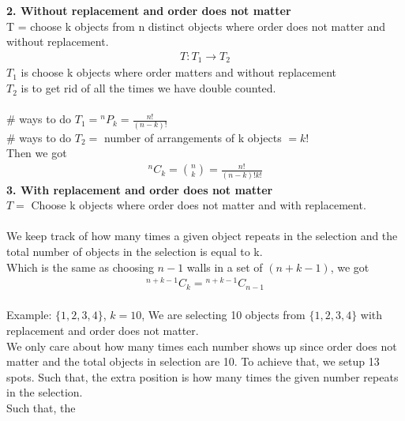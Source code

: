 \documentclass[11pt,oneside]{book}
\theoremstyle{break}
\theoremstyle{break}
\newcommand*{\Perm}[2]{{}^{#1}\!P_{#2}}
\newcommand*{\Comb}[2]{{}^{#1}C_{#2}}
\newcommand{\example}{\color{green}Example: \color{black}}
\begin{document}
\hfill\\
\hfill\\
\textbf{2. Without replacement and order does not matter}\\
T = choose k objects from n distinct objects where order does not matter and without replacement. \begin{align*}
T:T_1\rightarrow T_2
\end{align*}
$T_1$ is choose k objects where order matters and without replacement \\
$T_2$ is to get rid of all the times we have double counted.\\
\hfill\\
$\#$ ways to do $T_1=\Perm{n}{k}=\frac{n!}{(n-k)!}$\\
$\#$ ways to do $T_2=$ number of arrangements of k objects $=k!$\\
Then we got \begin{align*}
\Comb{n}{k}=\binom nk =\frac{n!}{(n-k)!k!}
\end{align*}
\textbf{3. With replacement and order does not matter}\\
$T=$ Choose k objects where order does not matter and with replacement. \\
\hfill\\
We keep track of how many times a given object repeats in the selection and the total number of objects in the selection is equal to k.\\
Which is the same as choosing $n-1$ walls in a set of $(n+k-1)$, we got \begin{align*}
\Comb{n+k-1}{k}=\Comb{n+k-1}{n-1}
\end{align*}
\hfill\\
\example $\{1,2,3,4\}$, $k=10$, We are selecting 10 objects from $\{1,2,3,4\}$ with replacement and order does not matter.\\
We only care about how many times each number shows up since order does not matter and the total objects in selection are 10. To achieve that, we setup 13 spots. Such that, the extra position is how many times the given number repeats in the selection.\\
Such that, the
\newpage
\end{document}
